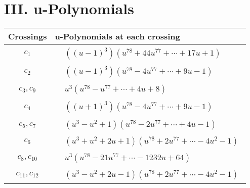 \documentclass[1p]{elsarticle_modified}
\theoremstyle{definition}
\begin{document}
\newpage\renewcommand{\arraystretch}{1}
\centering \section*{ III. u-Polynomials}
\begin{tabular}{m{50pt}|m{274pt}}
Crossings & \hspace{64pt}u-Polynomials at each crossing \\
\hline $$\begin{aligned}c_{1}\end{aligned}$$&$\begin{aligned}
&((u-1)^3)(u^{78}+44 u^{77}+\cdots+17 u+1)
\end{aligned}$\\
\hline $$\begin{aligned}c_{2}\end{aligned}$$&$\begin{aligned}
&((u-1)^3)(u^{78}-4 u^{77}+\cdots+9 u-1)
\end{aligned}$\\
\hline $$\begin{aligned}c_{3},c_{9}\end{aligned}$$&$\begin{aligned}
&u^3(u^{78}- u^{77}+\cdots+4 u+8)
\end{aligned}$\\
\hline $$\begin{aligned}c_{4}\end{aligned}$$&$\begin{aligned}
&((u+1)^3)(u^{78}-4 u^{77}+\cdots+9 u-1)
\end{aligned}$\\
\hline $$\begin{aligned}c_{5},c_{7}\end{aligned}$$&$\begin{aligned}
&(u^3- u^2+1)(u^{78}-2 u^{77}+\cdots+4 u-1)
\end{aligned}$\\
\hline $$\begin{aligned}c_{6}\end{aligned}$$&$\begin{aligned}
&(u^3+u^2+2 u+1)(u^{78}+2 u^{77}+\cdots-4 u^2-1)
\end{aligned}$\\
\hline $$\begin{aligned}c_{8},c_{10}\end{aligned}$$&$\begin{aligned}
&u^3(u^{78}-21 u^{77}+\cdots-1232 u+64)
\end{aligned}$\\
\hline $$\begin{aligned}c_{11},c_{12}\end{aligned}$$&$\begin{aligned}
&(u^3- u^2+2 u-1)(u^{78}+2 u^{77}+\cdots-4 u^2-1)
\end{aligned}$\\
\hline
\end{tabular}\newpage\renewcommand{\arraystretch}{1}
\end{document}
